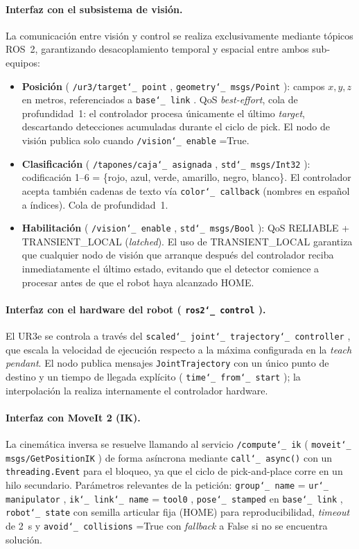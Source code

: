 \documentclass[12pt,a4paper]{article}
\newcommand{\code}[1]{%
  \begingroup
  \def\_{\char`_\penalty0 }%
  \def\/{\char`/\penalty0 }%
  \texttt{\small #1}%
  \endgroup}
\begin{document}
\paragraph{Interfaz con el subsistema de visión.}
La comunicación entre visión y control se realiza exclusivamente mediante tópicos ROS~2, garantizando
desacoplamiento temporal y espacial entre ambos sub-equipos:
\begin{itemize}
  \item \textbf{Posición} (\code{/ur3/target\_point}, \code{geometry\_msgs/Point}): campos $x,y,z$ en
        metros, referenciados a \code{base\_link}. QoS \textit{best-effort}, cola de profundidad~1: el
        controlador procesa únicamente el último \textit{target}, descartando detecciones acumuladas
        durante el ciclo de pick. El nodo de visión publica solo cuando \code{/vision\_enable}=True.
  \vspace{6.5pt}
  \item \textbf{Clasificación} (\code{/tapones/caja\_asignada}, \code{std\_msgs/Int32}): codificación
        1--6 = \{rojo, azul, verde, amarillo, negro, blanco\}. El controlador acepta también cadenas de
        texto vía \code{color\_callback} (nombres en español a índices). Cola de profundidad~1.
  \clearpage      
  \item \textbf{Habilitación} (\code{/vision\_enable}, \code{std\_msgs/Bool}): QoS RELIABLE +
        TRANSIENT\_LOCAL (\textit{latched}). El uso de TRANSIENT\_LOCAL garantiza que cualquier nodo de
        visión que arranque después del controlador reciba inmediatamente el último estado, evitando que
        el detector comience a procesar antes de que el robot haya alcanzado HOME.
\end{itemize}

\paragraph{Interfaz con el hardware del robot (\code{ros2\_control}).}
El UR3e se controla a través del \code{scaled\_joint\_trajectory\_controller}, que escala la velocidad de
ejecución respecto a la máxima configurada en la \textit{teach pendant}. El nodo publica mensajes
\code{JointTrajectory} con un único punto de destino y un tiempo de llegada explícito
(\code{time\_from\_start}); la interpolación la realiza internamente el controlador hardware.

\paragraph{Interfaz con MoveIt 2 (IK).}
La cinemática inversa se resuelve llamando al servicio \code{/compute\_ik}
(\code{moveit\_msgs/GetPositionIK}) de forma asíncrona mediante \code{call\_async()} con un
\code{threading.Event} para el bloqueo, ya que el ciclo de pick-and-place corre en un hilo secundario.
Parámetros relevantes de la petición: \code{group\_name}=\code{ur\_manipulator},
\code{ik\_link\_name}=\code{tool0}, \code{pose\_stamped} en \code{base\_link}, \code{robot\_state}
con semilla articular fija (HOME) para reproducibilidad, \textit{timeout} de 2~s y
\code{avoid\_collisions}=True con \textit{fallback} a False si no se encuentra solución.
\end{document}
